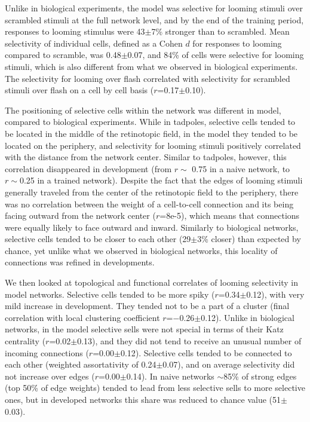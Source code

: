 \documentclass{article}
\begin{document}
Unlike in biological experiments, the model was selective for looming stimuli over scrambled stimuli at the full network level, and by the end of the training period, responses to looming stimulus were 43$\pm$7\% stronger than to scrambled. Mean selectivity of individual cells, defined as a Cohen $d$ for responses to looming compared to scramble, was 0.48$\pm$0.07, and 84\% of cells were selective for looming stimuli, which is also different from what we observed in biological experiments. The selectivity for looming over flash correlated with selectivity for scrambled stimuli over flash on a cell by cell basis ($r$=0.17$\pm$0.10).

The positioning of selective cells within the network was different in model, compared to biological experiments. While in tadpoles, selective cells tended to be located in the middle of the retinotopic field, in the model they tended to be located on the periphery, and selectivity for looming stimuli positively correlated with the distance from the network center. Similar to tadpoles, however, this correlation disappeared in development (from $r\sim$ 0.75 in a naive network, to $r\sim$0.25 in a trained network). Despite the fact that the edges of looming stimuli generally traveled from the center of the retinotopic field to the periphery, there was no correlation between the weight of a cell-to-cell connection and its being facing outward from the network center ($r$=8e-5), which means that connections were equally likely to face outward and inward. Similarly to biological networks, selective cells tended to be closer to each other (29$\pm$3\% closer) than expected by chance, yet unlike what we observed in biological networks, this locality of connections was refined in developments.

We then looked at topological and functional correlates of looming selectivity in model networks. Selective cells tended to be more spiky ($r$=0.34$\pm$0.12), with very mild increase in development. They tended not to be a part of a cluster (final correlation with local clustering coefficient $r$=$-$0.26$\pm$0.12). Unlike in biological networks, in the model selective sells were not special in terms of their Katz centrality ($r$=0.02$\pm$0.13), and they did not tend to receive an unusual number of incoming connections ($r$=0.00$\pm$0.12). Selective cells tended to be connected to each other (weighted assortativity of 0.24$\pm$0.07), and on average selectivity did not increase over edges ($r$=0.00$\pm$0.14). In naive networks $\sim$85\% of strong edges (top 50\% of edge weights) tended to lead from less selective sells to more selective ones, but in developed networks this share was reduced to chance value (51$±$0.03).
\end{document}
